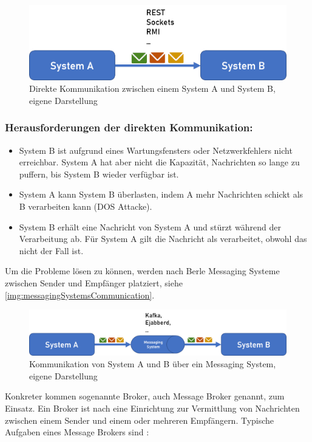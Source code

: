 \documentclass[a4paper,titlepage,halfparskip,12pt]{scrreprt}
\begin{document}
\begin{onehalfspacing}
\begin{figure}[h]
	\centering
	\includegraphics[width=.8\linewidth]{images/directCommunication}
	\caption{Direkte Kommunikation zwischen einem System A und System B, eigene Darstellung}
	\label{img:directCommunication}
\end{figure}

\subsubsection*{Herausforderungen der direkten Kommunikation\cite{berleKafkaOverview}:}

\begin{itemize}
\item System B ist aufgrund eines Wartungsfensters oder Netzwerkfehlers nicht erreichbar. System A hat aber nicht die Kapazität, Nachrichten so lange zu puffern, bis System B wieder verfügbar ist.
\item System A kann System B überlasten, indem A mehr Nachrichten schickt als B verarbeiten kann (\ac{DOS} Attacke).
\item System B erhält eine Nachricht von System A und stürzt während der Verarbeitung ab. Für System A gilt die Nachricht als verarbeitet, obwohl das nicht der Fall ist.
\end{itemize}

Um die Probleme lösen zu können, werden nach Berle Messaging Systeme zwischen Sender und Empfänger platziert, siehe \autoref{img:messagingSystemsCommunication}.

\begin{figure}[h]
	\centering
	\includegraphics[width=\linewidth]{images/messagingSystemsCommunication}
	\caption{Kommunikation von System A und B über ein Messaging System, eigene Darstellung}
	\label{img:messagingSystemsCommunication}
\end{figure}

Konkreter kommen sogenannte Broker, auch Message Broker genannt, zum Einsatz. Ein Broker ist nach \cite{kimmerBroker} eine Einrichtung zur Vermittlung von Nachrichten zwischen einem Sender und einem oder mehreren Empfängern. Typische Aufgaben eines Message Brokers sind \cite{kimmerBroker}:


\end{onehalfspacing}
\end{document}
